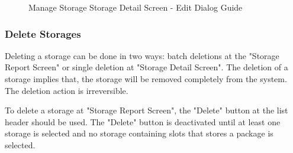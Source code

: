 \begin{figure}[H]
	\centering
    \vspace{5pt}
    \vspace{5pt}
    
    \caption{Manage Storage Storage Detail Screen - Edit Dialog Guide}
	\label{fig:MSDetailEditBtn}
\end{figure}

\subsubsection{Delete Storages}

Deleting a storage can be done in two ways: batch deletions at the "Storage Report Screen" or single deletion at "Storage Detail Screen". 
The deletion of a storage implies that, the storage will be removed completely from the system. The deletion action is irreversible. 

To delete a storage at "Storage Report Screen", the "Delete" button at the list header should be used. The "Delete" button is deactivated until at least one storage is selected and no storage containing slots that stores a package is selected.

